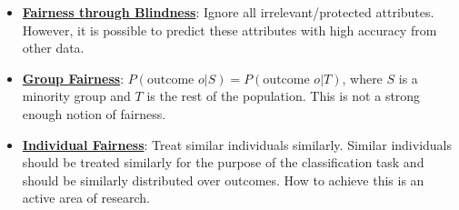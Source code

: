 \documentclass{article}%
\begin{document}
\begin{itemize}[leftmargin=*]%
\item \href{https://purdue.brightspace.com/d2l/common/assets/pdfjs-d2l-dist/1.0.14-legacy/web/viewer.html?file=\%2Fcontent\%2Fenforced\%2F1095467-wl.202510.CS.24300.001\%2F16L2-ethics.pdf\%3Fou\%3D1095467\&lang=en-us\&container=d2l-fileviewer-rendered-pdf\&fullscreen=d2l-fileviewer-rendered-pdf-dialog\&height=667#page=25}{\textbf{Fairness through Blindness}}: Ignore all irrelevant/protected attributes. However, it is possible to predict these attributes with high accuracy from other data.%
\item \href{https://purdue.brightspace.com/d2l/common/assets/pdfjs-d2l-dist/1.0.14-legacy/web/viewer.html?file=\%2Fcontent\%2Fenforced\%2F1095467-wl.202510.CS.24300.001\%2F16L2-ethics.pdf\%3Fou\%3D1095467\&lang=en-us\&container=d2l-fileviewer-rendered-pdf\&fullscreen=d2l-fileviewer-rendered-pdf-dialog\&height=667#page=26}{\textbf{Group Fairness}}: $P(\text{outcome } o | S) = P(\text{outcome } o | T)$, where $S$ is a minority group and $T$ is the rest of the population. This is not a strong enough notion of fairness.%
\item \href{https://purdue.brightspace.com/d2l/common/assets/pdfjs-d2l-dist/1.0.14-legacy/web/viewer.html?file=\%2Fcontent\%2Fenforced\%2F1095467-wl.202510.CS.24300.001\%2F16L2-ethics.pdf\%3Fou\%3D1095467\&lang=en-us\&container=d2l-fileviewer-rendered-pdf\&fullscreen=d2l-fileviewer-rendered-pdf-dialog\&height=667#page=27}{\textbf{Individual Fairness}}: Treat similar individuals similarly. Similar individuals should be treated similarly for the purpose of the classification task and should be similarly distributed over outcomes. How to achieve this is an active area of research.%
\end{itemize}

%
\end{document}
